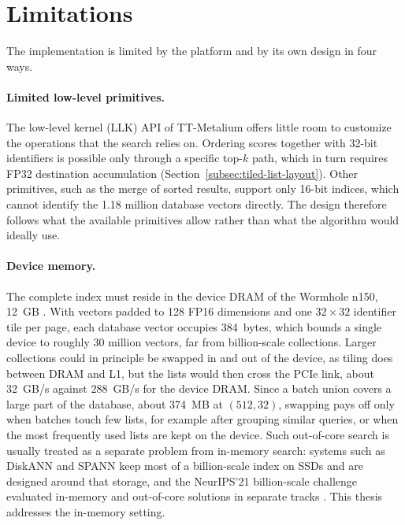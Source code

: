 \section{Limitations}
\label{sec:conclusion-limitations}

The implementation is limited by the platform and by its own design in four
ways.

\paragraph{Limited low-level primitives.} The low-level kernel (LLK) API of
TT-Metalium offers little room to customize the operations that the search
relies on. Ordering scores together with 32-bit identifiers is possible only
through a specific top-\(k\) path, which in turn requires FP32 destination
accumulation (Section~\ref{subsec:tiled-list-layout}). Other primitives, such
as the merge of sorted results, support only 16-bit indices, which cannot
identify the 1.18 million database vectors directly. The design therefore
follows what the available primitives allow rather than what the algorithm
would ideally use.

\paragraph{Device memory.} The complete index must reside in the device DRAM
of the Wormhole n150, 12~GB \cite{tenstorrent_wormhole_spec}. With vectors
padded to 128 FP16 dimensions and one \(32\times32\) identifier tile per page,
each database vector occupies 384~bytes, which bounds a single device to
roughly 30 million vectors, far from billion-scale collections. Larger collections could in
principle be swapped in and out of the device, as tiling does between DRAM and
L1, but the lists would then cross the PCIe link, about 32~GB/s against
288~GB/s for the device DRAM. Since a batch union covers a large part of the
database, about 374~MB at \((512,32)\), swapping pays off only when batches
touch few lists, for example after grouping similar queries, or when the most
frequently used lists are kept on the device. Such out-of-core search is
usually treated as a separate problem from in-memory search: systems such as
DiskANN \cite{diskann} and SPANN \cite{spann} keep most of a billion-scale
index on SSDs and are designed around that storage, and the NeurIPS'21
billion-scale challenge evaluated in-memory and out-of-core solutions in
separate tracks \cite{bigann_neurips21}. This thesis addresses the in-memory
setting.

